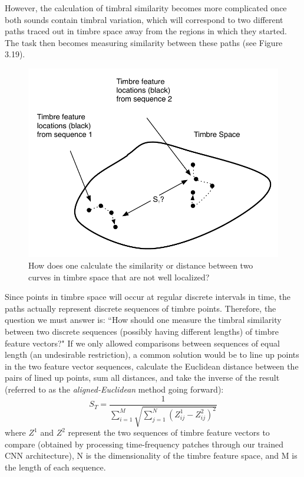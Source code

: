 \documentclass[12pt]{report} 	%
\numberwithin{figure}{chapter}
\numberwithin{table}{chapter}
\numberwithin{equation}{chapter}
\begin{document}
\begin{flushleft}
However, the calculation of timbral similarity becomes more complicated once both sounds contain timbral variation, which will correspond to two different paths traced out in timbre space away from the regions in which they started. The task then becomes measuring similarity between these paths (see Figure 3.19).
\begin{figure}[h!]
\begin{center}
\includegraphics[scale=0.8]{TimbreDistance2}
\caption[Timbre distance between curves]{How does one calculate the similarity or distance between two curves in timbre space that are not well localized?}
\end{center}
\end{figure}

Since points in timbre space will occur at regular discrete intervals in time, the paths actually represent discrete sequences of timbre points. Therefore, the question we must answer is: ``How should one measure the timbral similarity between two discrete sequences (possibly having different lengths) of timbre feature vectors?" If we only allowed comparisons between sequences of equal length (an undesirable restriction), a common solution would be to line up points in the two feature vector sequences, calculate the Euclidean distance between the pairs of lined up points, sum all distances, and take the inverse of the result (referred to as the \textit{aligned-Euclidean} method going forward):
\begin{equation}
S_T = \frac{1}{\sum_{i=1}^{M}\sqrt{\sum_{j=1}^{N}(Z_{ij}^1 - Z_{ij}^2)^2}}
\end{equation}
where $Z^1$ and $Z^2$ represent the two sequences of timbre feature vectors to compare (obtained by processing time-frequency patches through our trained CNN architecture), N is the dimensionality of the timbre feature space, and M is the length of each sequence.


\end{flushleft}
\end{document}
